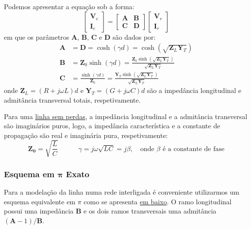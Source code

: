 Podemos apresentar a equação sob a forma:
$$
    \begin{bmatrix}
        \mathbf{V}_e \\[6pt]
        \mathbf{I}_e
    \end{bmatrix}
    =
    \begin{bmatrix}
        \mathbf{A} & \mathbf{B} \\[6pt]
        \mathbf{C} & \mathbf{D}
    \end{bmatrix}
    \begin{bmatrix}
        \mathbf{V}_r \\[6pt]
        \mathbf{I}_r
    \end{bmatrix}
$$
em que os parâmetros $\mathbf{A}$, $\mathbf{B}$, $\mathbf{C}$ e $\mathbf{D}$ são dados por:
$$
    \begin{aligned}
        \mathbf{A} &= \mathbf{D} = \cosh(\gamma d) = \cosh(\sqrt{\mathbf{Z}_L \mathbf{Y}_T}) \\[1pt]
        \mathbf{B} &= \mathbf{Z}_0 \sinh(\gamma d) = \frac{\mathbf{Z}_0 \sinh(\sqrt{\mathbf{Z}_L \mathbf{Y}_T})}{\sqrt{\mathbf{Z}_L \mathbf{Y}_T}} \\[1pt]
        \mathbf{C} &= \frac{\sinh(\gamma d)}{\mathbf{Z}_0} = \frac{\mathbf{Y}_T \sinh(\sqrt{\mathbf{Z}_L \mathbf{Y}_T})}{\sqrt{\mathbf{Z}_L \mathbf{Y}_T}}
    \end{aligned}
$$
onde $\mathbf{Z}_L = (R + j\omega L)d$ e $\mathbf{Y}_T = (G + j\omega C)d$ são a impedância longitudinal e admitância transversal totais, respetivamente.

\begin{mdframed}
    Para uma \underline{linha sem perdas}, a impedância longitudinal e a admitância transversal são imaginários puros, logo, a impedância característica e a constante de propagação são real e imaginária pura, respetivamente:
    $$
        \mathbf{Z_0} = \sqrt{\dfrac{L}{C}}
        \qquad\quad
        \gamma = j\omega\sqrt{LC} = j\beta, \quad \text{onde $\beta$ é a constante de fase}
    $$
\end{mdframed}

\subsubsection[Esquema em $\pi$ Exato]{Esquema em $\pmb{\pi}$ Exato}

Para a modelação da linha numa rede interligada é conveniente utilizarmos um esquema equivalente em $\pi$ como se apresenta \hyperref[fig:linha-transmissao-esq-exato]{em baixo}. O ramo longitudinal possui uma impedância $\mathbf{B}$ e os dois ramos transversais uma admitância $(\mathbf{A}-1)/\mathbf{B}$.

